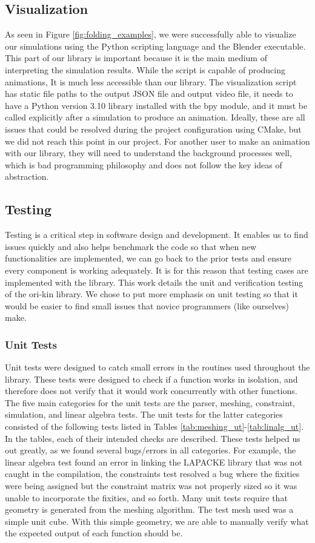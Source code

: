\subsection{Visualization}
As seen in Figure \ref{fig:folding_examples}, we were successfully able to visualize our simulations using the Python scripting language and the Blender executable. This part of our library is important because it is the main medium of interpreting the simulation results. While the script is capable of producing animations, It is much less accessible than our library. The visualization script has static file paths to the output JSON file and output video file, it needs to have a Python version 3.10 library installed with the bpy module, and it must be called explicitly after a simulation to produce an animation. Ideally, these are all issues that could be resolved during the project configuration using CMake, but we did not reach this point in our project. For another user to make an animation with our library, they will need to understand the background processes well, which is bad programming philosophy and does not follow the key ideas of abstraction.
\subsection{Testing}
Testing is a critical step in software design and development. It enables us to find issues quickly and also helps benchmark the code so that when new functionalities are implemented, we can go back to the prior tests and ensure every component is working adequately. It is for this reason that testing cases are implemented with the library. This work details the unit and verification testing of the ori-kin library. We chose to put more emphasis on unit testing so that it would be easier to find small issues that novice programmers (like ourselves) make. 
\subsubsection{Unit Tests}
Unit tests were designed to catch small errors in the routines used throughout the library. These tests were designed to check if a function works in isolation, and therefore does not verify that it would work concurrently with other functions. The five main categories for the unit tests are the parser, meshing, constraint, simulation, and linear algebra tests.
The unit tests for the latter categories consisted of the following tests listed in Tables \ref{tab:meshing_ut}-\ref{tab:linalg_ut}. In the tables, each of their intended checks are described. These tests helped us out greatly, as we found several bugs/errors in all categories. For example, the linear algebra test found an error in linking the LAPACKE library that was not caught in the compilation, the constraints test resolved a bug where the fixities were being assigned but the constraint matrix was not properly sized so it was unable to incorporate the fixities, and so forth. Many unit tests require that geometry is generated from the meshing algorithm. The test mesh used was a simple unit cube. With this simple geometry, we are able to manually verify what the expected output of each function should be.
